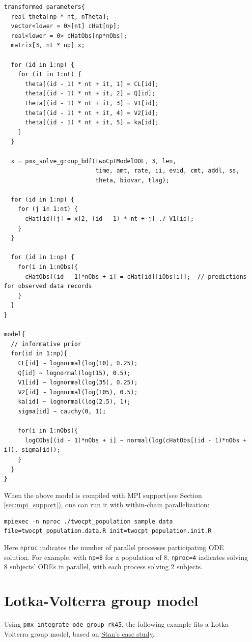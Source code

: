 \documentclass[10pt, reqno, oneside]{amsbook}
\numberwithin{equation}{chapter}
\numberwithin{figure}{chapter}
\numberwithin{table}{chapter}
\theoremstyle{remark}
\begin{document}
\begin{verbatim}
transformed parameters{
  real theta[np * nt, nTheta];
  vector<lower = 0>[nt] cHat[np];
  real<lower = 0> cHatObs[np*nObs];
  matrix[3, nt * np] x; 

  for (id in 1:np) {
    for (it in 1:nt) {
      theta[(id - 1) * nt + it, 1] = CL[id];
      theta[(id - 1) * nt + it, 2] = Q[id];
      theta[(id - 1) * nt + it, 3] = V1[id];
      theta[(id - 1) * nt + it, 4] = V2[id];
      theta[(id - 1) * nt + it, 5] = ka[id];
    }
  }

  x = pmx_solve_group_bdf(twoCptModelODE, 3, len,
                          time, amt, rate, ii, evid, cmt, addl, ss,
                          theta, biovar, tlag);

  for (id in 1:np) {
    for (j in 1:nt) {
      cHat[id][j] = x[2, (id - 1) * nt + j] ./ V1[id];
    }
  }

  for (id in 1:np) {
    for(i in 1:nObs){
      cHatObs[(id - 1)*nObs + i] = cHat[id][iObs[i]];  // predictions for observed data records
    }
  }
}

model{
  // informative prior
  for(id in 1:np){
    CL[id] ~ lognormal(log(10), 0.25);
    Q[id] ~ lognormal(log(15), 0.5);
    V1[id] ~ lognormal(log(35), 0.25);
    V2[id] ~ lognormal(log(105), 0.5);
    ka[id] ~ lognormal(log(2.5), 1);
    sigma[id] ~ cauchy(0, 1);

    for(i in 1:nObs){
      logCObs[(id - 1)*nObs + i] ~ normal(log(cHatObs[(id - 1)*nObs + i]), sigma[id]);
    }
  }
}
\end{verbatim}

When the above model is compiled with MPI support(see Section
\ref{sec:mpi_support}), one can run it with within-chain
parallelization:
\begin{verbatim}
mpiexec -n nproc ./twocpt_population sample data file=twocpt_population.data.R init=twocpt_population.init.R
\end{verbatim}
Here \texttt{nproc} indicates the number of parallel
processes participating ODE solution. For example, with
\texttt{np=8} for a population of 8,
\texttt{nproc=4} indicates solving 8 subjects' ODEs in
parallel, with each process solving 2 subjects.

\section{Lotka-Volterra group model}
\label{sec:org0ba5494}
Using \texttt{pmx\_integrate\_ode\_group\_rk45}, the following example fits
a Lotka-Volterra group model, based on \href{https://mc-stan.org/users/documentation/case-studies/lotka-volterra-predator-prey.html}{Stan's case study}.
\end{document}
